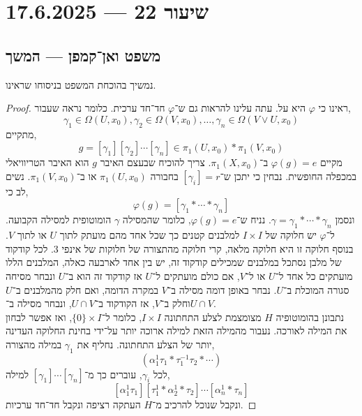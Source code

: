 \section{שיעור 22 --- 17.6.2025}

\subsection{משפט ואן־קמפן --- המשך}
נמשיך בהוכחת המשפט בניסוחו שראינו.
\begin{proof}
	ראינו כי $\varphi$ היא על.
	עתה עלינו להראות גם ש־$\varphi$ חד־חד ערכית.
	כלומר נראה שעבור,
	\[
		\gamma_1 \in \Omega(U, x_0),
		\gamma_2 \in \Omega(V, x_0),
		\ldots,
		\gamma_n \in \Omega(V \lor U, x_0)
	\]
	מתקיים,
	\[
		g = [\gamma_1] [\gamma_2] \cdots [\gamma_n] \in \pi_1(U, x_0) * \pi_1(V, x_0)
	\]
	מקיים $\varphi(g) = e$ ב־$\pi_1(X, x_0)$.
	צריך להוכיח שבעצם האיבר $g$ הוא האיבר הטריוויאלי במכפלה החופשית.
	נבחין כי יתכן ש־$[\gamma_i] = r$ בחבורה $\pi_1(U, x_0)$ או ב־$\pi_1(V, x_0)$.
	נשים לב כי,
	\[
		\varphi(g)
		= [\gamma_1 * \cdots * \gamma_n]
	\]
	ונסמן $\gamma = \gamma_1 * \cdots * \gamma_n$.
	נניח ש־$\varphi(g) = e$, כלומר שהמסילה $\gamma$ הומוטופית למסילה הקבועה.
	ל־$\varphi$ יש חלוקה של $I \times I$ למלבנים קטנים כך שכל אחד מהם מועתק לתוך $U$ או לתוך $V$.
	בנוסף חלוקה זו היא חלוקה מלאה, קרי חלוקה מהתצורה של חלוקות של אינפי 3.
	לכל קודקוד של מלבן נסתכל במלבנים שמכילים קודקוד זה, יש בין אחד לארבעה כאלה,
	המלבנים הללו מועתקים כל אחד ל־$U$ או ל־$V$, אם כולם מועתקים ל־$U$ אז קודקוד זה הוא ב־$U$ ונבחר מסיחה סגורה המוכלת ב־$U$.
	נבחר באופן דומה מסילה ב־$V$ במקרה הדומה, ואם חלק מהמלבנים ב־$U$ וחלק ב־$V$, אז הקודקוד ב־$U \cap V$, 
	ונבחר מסילה ב־$U \cap V$. \\
	נתבונן בהומוטופיה $H$ מצומצמת לצלע התחתונה $I \times I$, כלומר ל־$\{ 0 \} \times I$, ואז אפשר לבחון את המילה לאורכה.
	נעבור מהמילה הזאת למילה ארוכה יותר על־ידי בחינת החלוקה העדינה יותר של הצלע התחתונה.
	נחליף את $\gamma_1$ במילה מהצורה,
	\[
		(\alpha_1^1 \tau_1 * \tau_1^{-1} \tau_2 * \cdots)
	\]
	לכל $\gamma_i$, עוברים כך מ־$[\gamma_1] \cdots [\gamma_n]$ למילה,
	\[
		[\alpha_1^1 \tau_1] [\tau_1^1 * \alpha_2^1 * \tau_2] \cdots [\alpha_n^1 * \tau_n]
	\]
	ונקבל שנוכל להרכיב מ־$H$ העתקה רציפה ונקבל חד־חד ערכיות.
\end{proof}

\listoftheorems[title=הגדרות ומשפטים,ignoreall,show={theorem,definition},swapnumber,onlynamed={proposition}]


